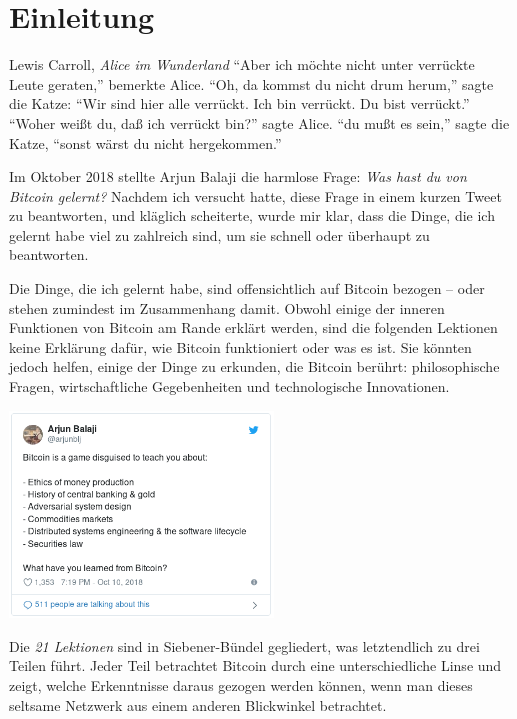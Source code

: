 \chapter*{Einleitung}
\label{ch:introduction}

\begin{chapquote}{Lewis Carroll, \textit{Alice im Wunderland}}
\enquote{Aber ich möchte nicht unter verrückte Leute geraten,} bemerkte Alice.
\enquote{Oh, da kommst du nicht drum herum,} sagte die Katze: \enquote{Wir sind
hier alle verrückt. Ich bin verrückt. Du bist verrückt.} \enquote{Woher weißt
du, daß ich verrückt bin?} sagte Alice. \enquote{du mußt es sein,} sagte die
Katze, \enquote{sonst wärst du nicht hergekommen.}
\end{chapquote}

Im Oktober 2018 stellte Arjun Balaji die harmlose Frage: \textit{Was hast du von
Bitcoin gelernt?} Nachdem ich versucht hatte, diese Frage in einem kurzen Tweet
zu beantworten, und kläglich scheiterte, wurde mir klar, dass die Dinge, die ich
gelernt habe viel zu zahlreich sind, um sie schnell oder überhaupt zu
beantworten.

Die Dinge, die ich gelernt habe, sind offensichtlich auf Bitcoin bezogen – oder
stehen zumindest im Zusammenhang damit. Obwohl einige der inneren Funktionen von
Bitcoin am Rande erklärt werden, sind die folgenden Lektionen keine Erklärung
dafür, wie Bitcoin funktioniert oder was es ist. Sie könnten jedoch helfen,
einige der Dinge zu erkunden, die Bitcoin berührt: philosophische Fragen,
wirtschaftliche Gegebenheiten und technologische Innovationen.

\begin{center}
  \includegraphics[width=7cm]{assets/images/the-tweet.png}
\end{center}

Die \textit{21 Lektionen} sind in Siebener-Bündel gegliedert, was letztendlich
zu drei Teilen führt. Jeder Teil betrachtet Bitcoin durch eine
unterschiedliche Linse und zeigt, welche Erkenntnisse daraus gezogen werden
können, wenn man dieses seltsame Netzwerk aus einem anderen Blickwinkel
betrachtet.


